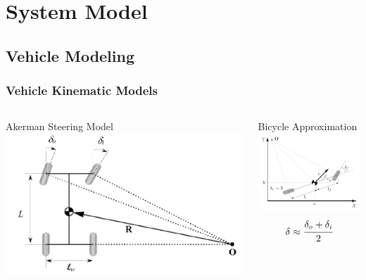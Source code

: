 \documentclass[aspectratio=169]{beamer}
\begin{document}
\section{System Model}
\subsection{Vehicle Modeling}

\begin{frame}
	\frametitle{Vehicle Kinematic Models}
	\begin{columns}
		\begin{column}[t]{0.4\textwidth}
			Akerman Steering Model
			\includegraphics[width = \columnwidth]{figs/akermanModel.png}
		\end{column}
		\begin{column}[t]{0.4\textwidth}
			Bicycle Approximation
			\includegraphics[width = \columnwidth]{figs/bikeModel.png}
			\[\delta \approx \cfrac{\delta_o + \delta_i}{2}\]
		\end{column}
	\end{columns}

\end{frame}
\end{document}
